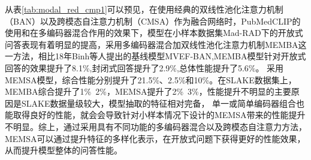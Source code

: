 从表\ref{tab:modal_red_cmp1}可以预见，在使用经典的双线性池化注意力机制（BAN）以及跨模态自注意力机制（CMSA）作为融合网络时，PubMedCLIP的使用和在多编码器混合作用的效果下，模型在小样本数据集Mad-RAD下的开放式
问答表现有着明显的提高，采用多编码器混合加双线性池化注意力机制MEMBA这一方法，相比18年Binh等人提出的基线模型MVEF-BAN\cite{nguyen2019overcoming},MEMBA模型针对开放式回答的效果提升了8.1\%,封闭式回答提升了2.9\%,总体性能提升了5.6\%。
采用MEMSA模型，综合性能分别提升了21.5\%、2.5\%和10\%。在SLAKE数据集上，MEMBA综合提升了1\%~2\%，MEMSA提升了2\%~3\%，性能提升不明显的主要原因是SLAKE数据量级较大，模型抽取的特征相对完备，
单一或简单编码器组合也能取得良好的性能，就会会导致针对小样本情况下设计的MEMSA带来的性能提升不明显。综上，通过采用具有不同功能的多编码器混合以及跨模态自注意力方法，MEMSA可以通过提升特征的多样化表示，在开放式问题下获得更好的性能效果，
从而提升模型整体的问答性能。
	
	

